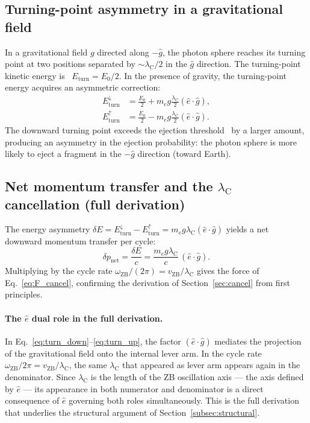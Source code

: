 \documentclass[%
 reprint, amsmath,amssymb, aps, prb, ]{revtex4-2}
\numberwithin{equation}{section}
\newcommand{\omZB}{\omega_{\text{ZB}}}
\newcommand{\lambdaC}{\lambda_{\mathrm{C}}}
\newcommand{\vZB}{v_{\mathrm{ZB}}}
\begin{document}
\subsection{Turning-point asymmetry in a gravitational field}
\label{subsec:turning_point}

In a gravitational field $g$ directed along $-\hat{g}$, the photon sphere reaches its turning point at two positions separated by $\sim\lambdaC/2$ in the $\hat{g}$ direction. The turning-point kinetic energy is~\cite{hanamura46,hanamura49} $E_\mathrm{turn} = E_0/2$. In the presence of gravity, the turning-point energy acquires an asymmetric correction:
\begin{align}
E_\mathrm{turn}^\downarrow &= \frac{E_0}{2} + m_e g \frac{\lambdaC}{2}(\hat{e}\cdot\hat{g}), \label{eq:turn_down}\\
E_\mathrm{turn}^\uparrow &= \frac{E_0}{2} - m_e g \frac{\lambdaC}{2}(\hat{e}\cdot\hat{g}). \label{eq:turn_up}
\end{align}
The downward turning point exceeds the ejection threshold~\cite{hanamura49} by a larger amount, producing an asymmetry in the ejection probability: the photon sphere is more likely to eject a fragment in the $-\hat{g}$ direction (toward Earth).

\subsection{Net momentum transfer and the $\lambdaC$ cancellation (full derivation)}
\label{subsec:Fmg}

The energy asymmetry $\delta E = E_\mathrm{turn}^\downarrow - E_\mathrm{turn}^\uparrow = m_e g \lambdaC (\hat{e}\cdot\hat{g})$ yields a net downward momentum transfer per cycle:
\begin{equation}
\delta p_\mathrm{net} = \frac{\delta E}{c} = \frac{m_e g \lambdaC}{c}\,(\hat{e}\cdot\hat{g}).
\label{eq:delta_p}
\end{equation}
Multiplying by the cycle rate $\omZB/(2\pi) = \vZB/\lambdaC$ gives the force of Eq.~\eqref{eq:F_cancel}, confirming the derivation of Section~\ref{sec:cancel} from first principles.

\paragraph{The $\hat{e}$ dual role in the full derivation.}
In Eq.~\eqref{eq:turn_down}--\eqref{eq:turn_up}, the factor $(\hat{e}\cdot\hat{g})$ mediates the projection of the gravitational field onto the internal lever arm.
In the cycle rate $\omZB/2\pi = \vZB/\lambdaC$, the same $\lambdaC$ that appeared as lever arm appears again in the denominator.
Since $\lambdaC$ is the length of the ZB oscillation axis --- the axis defined by $\hat{e}$ --- its appearance in both numerator and denominator is a direct consequence of $\hat{e}$ governing both roles simultaneously.
This is the full derivation that underlies the structural argument of Section~\ref{subsec:structural}.
\end{document}
